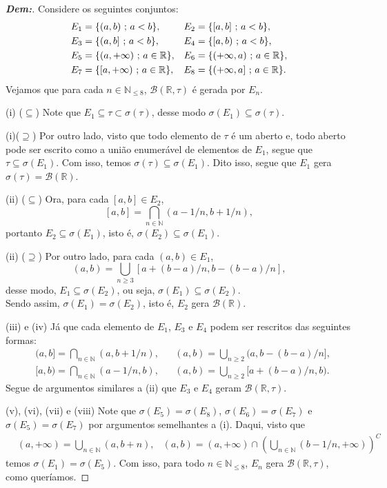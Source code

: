 \begin{proof}[\textbf{Dem:}]
Considere os seguintes conjuntos:
\begin{align*}
  &E_1 = \{(a, b) \text{ ; }  a<b\}, &&E_2= \{[a, b]\text{ ; }  a< b\},\\
  &E_3 = \{(a, b] \text{ ; }  a<b\}, &&E_4= \{[a, b)\text{ ; }  a< b\},\\
  &E_5 = \{(a, +\infty) \text{ ; }  a\in\mathbb R\}, &&E_6= \{(+\infty, a)\text{ ; }  a \in \mathbb R\}, \\
  &E_7 = \{[a, +\infty) \text{ ; }  a\in\mathbb R\}, &&E_8= \{(+\infty, a]\text{ ; }  a \in \mathbb R\}.
\end{align*}
Vejamos que para cada $n \in \mathbb N_{\leq 8}$, $\mathcal B(\mathbb R, \tau)$
é gerada por $E_n$.

(i) ($\subseteq$) Note que $E_1 \subseteq \tau \subset \sigma(\tau)$, 
desse modo $\sigma(E_1) \subseteq \sigma(\tau)$. 

(i)($\supseteq$) Por outro lado, visto que todo elemento de $\tau$ é um aberto
e, todo aberto pode ser escrito como a união enumerável de elementos de $E_1$, 
segue que $\tau \subseteq \sigma(E_1)$. Com isso, temos $\sigma(\tau) \subseteq \sigma(E_1)$.
Dito isso, segue que $E_1$ gera $\sigma(\tau)=\mathcal B (\mathbb R)$. 

(ii) ($\subseteq$) Ora, para cada $[a, b] \in E_2$, 
$$[a, b] = \bigcap\limits_{n \in \mathbb N} (a - 1/n, b + 1/n),$$
portanto $E_2 \subseteq \sigma(E_1)$, isto é, $\sigma(E_2) \subseteq \sigma(E_1)$. 

(ii) ($\supseteq$) Por outro lado, para cada $(a, b) \in E_1$,
$$(a, b) = \bigcup\limits_{n \ge 3} [a + (b-a)/n, b - (b-a)/n],$$
desse modo, $E_1 \subseteq \sigma(E_2)$, ou seja, $\sigma(E_1) \subseteq \sigma(E_2)$.\\
Sendo assim, $\sigma(E_1) = \sigma(E_2)$, isto é, $E_2$ gera $\mathcal B(\mathbb R)$.

(iii) e (iv) Já que cada elemento de $E_1$, $E_3$ e $E_4$ 
podem ser rescritos das seguintes formas: 
\begin{align*}
  &(a, b] = \bigcap\limits_{n \in \mathbb N} (a, b+1/n), 
  &&(a, b) = \bigcup\limits_{n \ge 2} (a, b-(b-a)/n],\\
  &[a, b) = \bigcap\limits_{n \in \mathbb N} (a-1/n, b), 
  &&(a, b) = \bigcup\limits_{n \ge 2} [a+(b-a)/n, b).
\end{align*}
Segue de argumentos similares a (ii) que $E_3$ e $E_4$ geram $\mathcal B(\mathbb R, \tau)$.

  (v), (vi), (vii) e (viii) Note que $\sigma(E_5) = \sigma(E_8)$, $\sigma(E_6) = \sigma(E_7)$ e 
  $\sigma(E_5) = \sigma(E_7)$ por argumentos semelhantes a (i). Daqui, visto que 
\begin{align*}
  &(a, +\infty) = \bigcup\limits_{n \in \mathbb N} (a, b+n), 
  &(a, b) = (a, +\infty) \cap \left(\bigcup\limits_{n \in \mathbb N} (b-1/n, +\infty) \right)^C
\end{align*}
  temos $\sigma(E_1) = \sigma(E_5)$. Com isso, para todo $n \in \mathbb N_{\le 8}$, $E_n$ gera 
  $\mathcal B(\mathbb R, \tau)$, como queríamos.
\end{proof}
\biglinend

